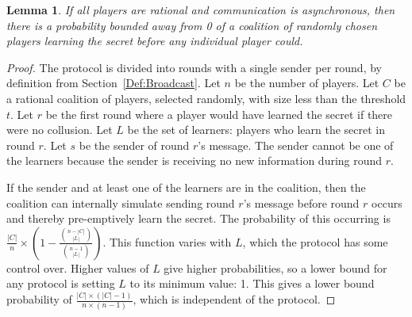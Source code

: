 \documentclass[12pt]{dalcsthesis}
\newtheorem{lemma}{Lemma}
\begin{document}
\begin{lemma}\label{Lem:Async:CoalitionsMayPreempt}If all players are rational and communication is asynchronous, then there is a probability bounded away from 0 of a coalition of randomly chosen players learning the secret before any individual player could.\end{lemma}
\begin{proof}
The protocol is divided into rounds with a single sender per round, by definition from Section~\ref{Def:Broadcast}. 
Let $n$ be the number of players.
Let $C$ be a rational coalition of players, selected randomly, with size less than the threshold $t$.
Let $r$ be the first round where a player would have learned the secret if there were no collusion.
Let $L$ be the set of learners: players who learn the secret in round $r$.
Let $s$ be the sender of round $r$'s message.
The sender cannot be one of the learners because the sender is receiving no new information during round $r$.

If the sender and at least one of the learners are in the coalition, then the coalition can internally simulate sending round $r$'s message before round $r$ occurs and thereby pre-emptively learn the secret. The probability of this occurring is $\frac{|C|}{n} \times \left(1 - \frac{\binom{n - |C|}{|L|}}{\binom{n - 1}{|L|}}\right)$. This function varies with $L$, which the protocol has some control over. Higher values of $L$ give higher probabilities, so a lower bound for any protocol is setting $L$ to its minimum value: 1. This gives a lower bound probability of $\frac{|C| \times (|C| - 1)}{n \times (n-1)}$, which is independent of the protocol.
\end{proof}
\end{document}
